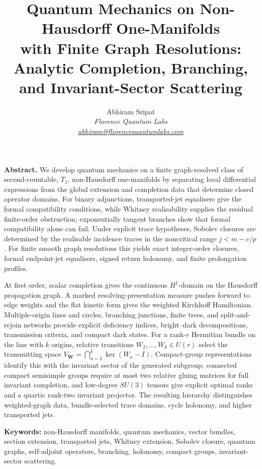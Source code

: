 \documentclass[11pt]{article}
\title{Quantum Mechanics on Non-Hausdorff One-Manifolds\\
with Finite Graph Resolutions:\\
Analytic Completion, Branching,\\
and Invariant-Sector Scattering}
\author{Abhiram Sripat\\
\textit{Florence Quantum Labs}\\
\href{mailto:abhiram@florencequantumlabs.com}{\textit{abhiram@florencequantumlabs.com}}}
\date{}
\theoremstyle{plain}
\theoremstyle{definition}
\begin{document}
\pagestyle{plain}
\maketitle
\thispagestyle{empty}

\begin{tcolorbox}[abstractbox]
\textbf{Abstract.}
We develop quantum mechanics on a finite graph-resolved class of second-countable, \(T_1\), non-Hausdorff one-manifolds by separating local differential expressions from the global extension and completion data that determine closed operator domains. For binary adjunctions, transported-jet equalisers give the formal compatibility conditions, while Whitney realisability supplies the residual finite-order obstruction; exponentially tangent branches show that formal compatibility alone can fail. Under explicit trace hypotheses, Sobolev closures are determined by the realisable incidence traces in the noncritical range \(j<m-c/p\). For finite smooth graph resolutions this yields exact integer-order closures, formal endpoint-jet equalisers, signed return holonomy, and finite prolongation profiles.

At first order, scalar completion gives the continuous \(H^1\)-domain on the Hausdorff propagation graph. A marked resolving-presentation measure pushes forward to edge weights and the flat kinetic form gives the weighted Kirchhoff Hamiltonian. Multiple-origin lines and circles, branching junctions, finite trees, and split-and-rejoin networks provide explicit deficiency indices, bright--dark decompositions, transmission criteria, and compact dark states. For a rank-\(r\) Hermitian bundle on the line with \(k\) origins, relative transitions \(W_2,\ldots,W_k\in U(r)\) select the transmitting space \(V_{\mathbf W}=\bigcap_{a=2}^k\ker(W_a-I)\). Compact-group representations identify this with the invariant sector of the generated subgroup; connected compact semisimple groups require at most two relative gluing matrices for full invariant completion, and low-degree \(SU(3)\) tensors give explicit optimal ranks and a quartic rank-two invariant projector. The resulting hierarchy distinguishes weighted-graph data, bundle-selected trace domains, cycle holonomy, and higher transported jets.
\end{tcolorbox}

\noindent\textbf{Keywords:}
non-Hausdorff manifolds, quantum mechanics, vector bundles, section extension,
transported jets, Whitney extension, Sobolev closure, quantum graphs,
self-adjoint operators, branching, holonomy, compact groups,
invariant-sector scattering.
\end{document}
